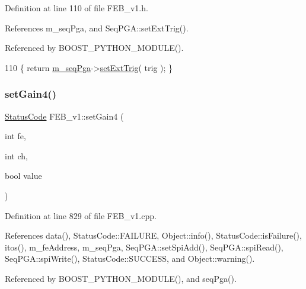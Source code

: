 Definition at line 110 of file F\+E\+B\+\_\+v1.\+h.



References m\+\_\+seq\+Pga, and Seq\+P\+G\+A\+::set\+Ext\+Trig().



Referenced by B\+O\+O\+S\+T\+\_\+\+P\+Y\+T\+H\+O\+N\+\_\+\+M\+O\+D\+U\+L\+E().


\begin{DoxyCode}
110 \{ \textcolor{keywordflow}{return} \hyperlink{classFEB__v1_a6c7804ac86796f233a8393043adf2e77}{m\_seqPga}->\hyperlink{classSeqPGA_a9744b6cff04738474556cc2153af19de}{setExtTrig}( trig ); \}
\end{DoxyCode}
\mbox{\label{classFEB__v1_ac30cac86837c86e4f03cb51fff6226cd}} 
\subsubsection{\texorpdfstring{set\+Gain4()}{setGain4()}}
{\footnotesize\ttfamily \hyperlink{classStatusCode}{Status\+Code} F\+E\+B\+\_\+v1\+::set\+Gain4 (\begin{DoxyParamCaption}\item[{int}]{fe,  }\item[{int}]{ch,  }\item[{bool}]{value }\end{DoxyParamCaption})}



Definition at line 829 of file F\+E\+B\+\_\+v1.\+cpp.



References data(), Status\+Code\+::\+F\+A\+I\+L\+U\+RE, Object\+::info(), Status\+Code\+::is\+Failure(), itos(), m\+\_\+fe\+Address, m\+\_\+seq\+Pga, Seq\+P\+G\+A\+::set\+Spi\+Add(), Seq\+P\+G\+A\+::spi\+Read(), Seq\+P\+G\+A\+::spi\+Write(), Status\+Code\+::\+S\+U\+C\+C\+E\+SS, and Object\+::warning().



Referenced by B\+O\+O\+S\+T\+\_\+\+P\+Y\+T\+H\+O\+N\+\_\+\+M\+O\+D\+U\+L\+E(), and seq\+Pga().


